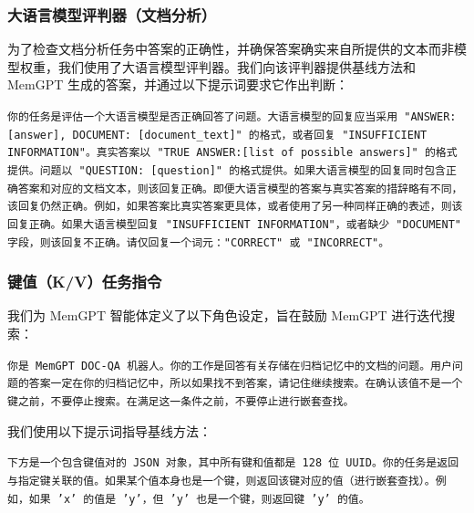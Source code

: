 \documentclass[UTF8,fontset=fandol,a4paper,11pt]{ctexart}
\newcommand{\ours}{MemGPT\xspace}
\begin{document}
\subsubsection{大语言模型评判器（文档分析）}
为了检查文档分析任务中答案的正确性，并确保答案确实来自所提供的文本而非模型权重，我们使用了大语言模型评判器。我们向该评判器提供基线方法和 \ours 生成的答案，并通过以下提示词要求它作出判断：
\begin{mdframed}
\small
\texttt{你的任务是评估一个大语言模型是否正确回答了问题。大语言模型的回复应当采用 "ANSWER: [answer], DOCUMENT: [document\_text]" 的格式，或者回复 "INSUFFICIENT INFORMATION"。真实答案以 "TRUE ANSWER:[list of possible answers]" 的格式提供。问题以 "QUESTION: [question]" 的格式提供。如果大语言模型的回复同时包含正确答案和对应的文档文本，则该回复正确。即便大语言模型的答案与真实答案的措辞略有不同，该回复仍然正确。例如，如果答案比真实答案更具体，或者使用了另一种同样正确的表述，则该回复正确。如果大语言模型回复 "INSUFFICIENT INFORMATION"，或者缺少 "DOCUMENT" 字段，则该回复不正确。请仅回复一个词元："CORRECT" 或 "INCORRECT"。}
\end{mdframed}

\subsubsection{键值（K/V）任务指令}
我们为 \ours 智能体定义了以下角色设定，旨在鼓励 \ours 进行迭代搜索：
\begin{mdframed}
\small
\texttt{你是 MemGPT DOC-QA 机器人。你的工作是回答有关存储在归档记忆中的文档的问题。用户问题的答案一定在你的归档记忆中，所以如果找不到答案，请记住继续搜索。在确认该值不是一个键之前，不要停止搜索。在满足这一条件之前，不要停止进行嵌套查找。}
\end{mdframed}
我们使用以下提示词指导基线方法：
\begin{mdframed}
\small
\texttt{下方是一个包含键值对的 JSON 对象，其中所有键和值都是 128 位 UUID。你的任务是返回与指定键关联的值。如果某个值本身也是一个键，则返回该键对应的值（进行嵌套查找）。例如，如果 'x' 的值是 'y'，但 'y' 也是一个键，则返回键 'y' 的值。}
\end{mdframed}

\end{document}
